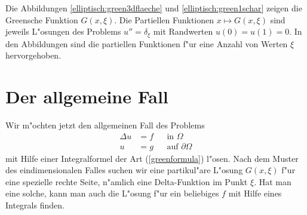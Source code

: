 Die Abbildungen \ref{elliptisch:green3dflaeche} und
\ref{elliptisch:green1schar} zeigen die Greensche Funktion $G(x,\xi)$.
Die Partiellen Funktionen $x\mapsto G(x,\xi)$ sind jeweils L"osungen
des Problems $u''=\delta_\xi$ mit Randwerten $u(0)=u(1)=0$.
In den Abbildungen sind die partiellen Funktionen f"ur eine Anzahl
von Werten $\xi$ hervorgehoben.

\section{Der allgemeine Fall}
Wir m"ochten jetzt den allgemeinen Fall des Problems
\begin{align*}
\Delta u&=f&&\text{in $\Omega$}\\
u&=g&&\text{auf $\partial\Omega$}
\end{align*}
mit Hilfe einer Integralformel der Art (\ref{greenformula}) 
l"osen. Nach dem Muster des eindimensionalen Falles suchen
wir eine partikul"are L"osung $G(x,\xi)$ f"ur eine spezielle rechte Seite,
n"amlich eine Delta-Funktion im Punkt $\xi$.  Hat man eine
solche, kann man auch die L"osung f"ur ein beliebiges $f$ mit
Hilfe eines Integrals finden.

